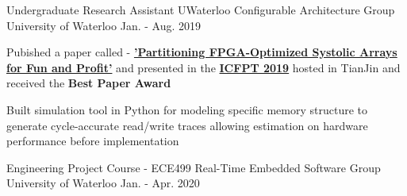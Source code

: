 


\begin{cventries}


\cventry
{Undergraduate Research Assistant} %
{UWaterloo Configurable Architecture Group} %
{University of Waterloo} %
{Jan. - Aug. 2019} %
{ %
\begin{cvitems}
\item {
    Pubished a paper called - 
    \textbf{
        \href{https://git.uwaterloo.ca/watcag-public/fpga-syspart}
        {'Partitioning FPGA-Optimized Systolic Arrays for Fun and Profit'}}
    and presented in the 
    \textbf{
        \href{http://fpt19.tju.edu.cn/Registration.htm}
        {ICFPT 2019}}
    hosted in TianJin and received the \textbf{Best Paper Award}
}
\item {
    Built simulation tool in Python for modeling specific memory 
    structure to generate cycle-accurate
    read/write traces allowing estimation on 
    hardware performance before implementation
}
\end{cvitems}
}


\cventry
{Engineering Project Course - ECE499} %
{Real-Time Embedded Software Group} %
{University of Waterloo} %
{Jan. - Apr. 2020} %
{ %
\begin{cvitems}
\item {
    
}
\end{cvitems}
}

\end{cventries}